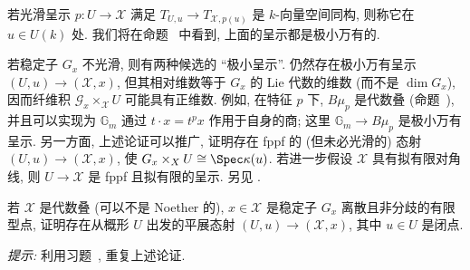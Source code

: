\begin{remark}\label{src:4.6.2}
若光滑呈示 $p:U\to\mathcal X$ 满足 $T_{U,u}\to T_{\mathcal X,p(u)}$ 是 $k$-向量空间同构, 则称它在 $u\in U(k)$ 处. 我们将在命题~ 中看到, 上面的呈示都是极小万有的.

若稳定子 $G_x$ 不光滑, 则有两种候选的 ``极小呈示''. 仍然存在极小万有呈示 $(U,u)\to(\mathcal X,x)$, 但其相对维数等于 $G_x$ 的 Lie 代数的维数 (而不是 $\dim G_x$), 因而纤维积 $\mathcal G_x\times_{\mathcal X}U$ 可能具有正维数. 例如, 在特征 $p$ 下, $B\mu_p$ 是代数叠 (命题~), 并且可以实现为 $\mathbb G_m$ 通过 $t\cdot x=t^p x$ 作用于自身的商; 这里 $\mathbb G_m\to B\mu_p$ 是极小万有呈示. 另一方面, 上述论证可以推广, 证明存在 fppf 的 (但未必光滑的) 态射 $(U,u)\to(\mathcal X,x)$, 使 $\mathcal G_x\times_{\mathcal X}U\cong\Spec\kappa(u)$. 若进一步假设 $\mathcal X$ 具有拟有限对角线, 则 $U\to\mathcal X$ 是 fppf 且拟有限的呈示. 另见 \cite[Tag 06MC]{SP}.
\end{remark}
\begin{exercise}[技术性]\label{src:4.6.3}
若 $\mathcal X$ 是代数叠 (可以不是 Noether 的), $x\in\mathcal X$ 是稳定子 $G_x$ 离散且非分歧的有限型点, 证明存在从概形 $U$ 出发的平展态射 $(U,u)\to(\mathcal X,x)$, 其中 $u\in U$ 是闭点.

\textit{提示:} 利用习题~, 重复上述论证.
\end{exercise}
